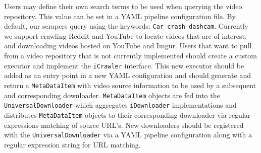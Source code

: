 \documentclass[letterpaper, 10 pt, conference]{IEEEconf}
\newcommand{\todo}[1]{{\color{red}#1}}
\begin{document}
Users may define their own search terms to be used when querying the video repository. This value can be set in a YAML pipeline configuration file. By default, our scrapers query using the keywords: \texttt{Car crash dashcam}. Currently we support crawling Reddit and YouTube to locate videos that are of interest, and downloading videos hosted on YouTube and Imgur. Users that want to pull from a video repository that is not currently implemented should create a custom executor and implement the \texttt{iCrawler} interface. This new executor should be added as an entry point in a new YAML configuration and should generate and return a \texttt{MetaDataItem} with video source information to be used by a subsequent and corresponding downloader. \texttt{MetaDataItem} objects are fed into the \texttt{UniversalDownloader} which aggregates \texttt{iDownloader} implementations and distributes \texttt{MetaDataItem} objects to their corresponding downloader via regular expressions matching of source URL's. New downloaders should be registered with the \texttt{UniversalDownloader} via a YAML pipeline configuration along with a regular expression string for URL matching.

%
\end{document}

